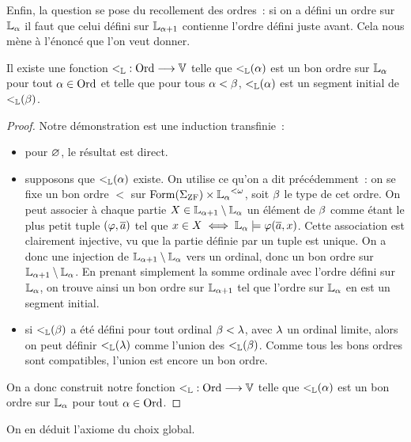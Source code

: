 Enfin, la question se pose du recollement des ordres~: si on a défini un ordre
sur $\mathbb L_{\alpha}$ il faut que celui défini sur $\mathbb L_{\alpha + 1}$ contienne l'ordre
défini juste avant. Cela nous mène à l'énoncé que l'on veut donner.

\begin{theorem}
  Il existe une fonction $\mathord{<_{\mathbb L}} : \displaystyle \operatorname{Ord} \longrightarrow \mathbb V$ telle que
  $\mathbin{<_{\mathbb L}}(\alpha)$ est un bon ordre sur $\mathbb L_\alpha$ pour tout
  $\alpha\in \operatorname{Ord}$ et telle que pour tous $\alpha < \beta$,
  $\mathbin{<_{\mathbb L}}(\alpha)$ est un segment initial de $\mathbin{<_{\mathbb L}}(\beta)$.
\end{theorem}

\begin{proof}
  Notre démonstration est une induction transfinie~:
  \begin{itemize}
  \item pour $\varnothing$, le résultat est direct.
  \item supposons que $\mathbin{<_{\mathbb L}}(\alpha)$ existe. On utilise ce qu'on a dit
    précédemment~: on se fixe un bon ordre $<$ sur
    $\operatorname{Form}(\Sigma_{\operatorname{ZF}})\times {\mathbb L_{\alpha}}^{<\omega}$, soit
    $\beta$ le type de cet ordre. On peut associer à chaque partie
    $X\in\mathbb L_{\alpha + 1}\setminus\mathbb L_\alpha$ un élément de $\beta$ comme étant le
    plus petit tuple $(\varphi,\overline{a})$ tel que
    $x\in X \iff \mathbb L_{\alpha}\models \varphi(\overline{a},x)$.
    Cette association est clairement injective, vu que la partie définie par
    un tuple est unique. On a donc une injection de
    $\mathbb L_{\alpha + 1}\setminus \mathbb L_\alpha$ vers un ordinal, donc un bon ordre sur
    $\mathbb L_{\alpha + 1} \setminus \mathbb L_\alpha$. En prenant simplement la somme
    ordinale avec l'ordre défini sur $\mathbb L_{\alpha}$, on trouve ainsi un bon ordre sur
    $\mathbb L_{\alpha + 1}$ tel que l'ordre sur $\mathbb L_{\alpha}$ en est un segment initial.
  \item si $\mathbin{<_{\mathbb L}}(\beta)$ a été défini pour tout ordinal
    $\beta < \lambda$, avec $\lambda$ un ordinal limite, alors on peut définir
    $\mathbin{<_{\mathbb L}}(\lambda)$ comme l'union des $\mathbin{<_{\mathbb L}}(\beta)$. Comme
    tous les bons ordres sont compatibles, l'union est encore un bon ordre.
  \end{itemize}
  On a donc construit notre fonction $\mathord{<_{\mathbb L}} : \displaystyle \operatorname{Ord} \longrightarrow \mathbb V$
  telle que $\mathbin{<_{\mathbb L}}(\alpha)$ est un bon ordre sur $\mathbb L_{\alpha}$ pour tout
  $\alpha\in\operatorname{Ord}$.
\end{proof}

\noindent
On en déduit l'axiome du choix global.

